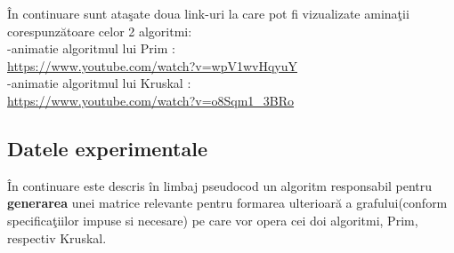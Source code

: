\documentclass[14pt]{article}
\begin{document}
\vspace{10mm}

\^In continuare sunt ata\c sate doua link-uri la care pot fi vizualizate amina\c tii corespunz\u{a}toare celor 2 algoritmi:\\

\vspace{1mm}
-animatie algoritmul lui Prim :\\
\textcolor{blue}{\url{https://www.youtube.com/watch?v=wpV1wvHqyuY}}\\
-animatie algoritmul lui Kruskal :\\
\textcolor{blue}{\url{https://www.youtube.com/watch?v=o8Sqm1_3BRo}}

\newpage

\subsection{Datele experimentale}
\vspace{3mm}
\^In continuare este descris \^in limbaj pseudocod un algoritm responsabil pentru \textbf{generarea} unei matrice relevante pentru formarea ulterioar\u{a} a grafului(conform specifica\c tiilor impuse si necesare) pe care vor opera cei doi algoritmi, Prim, respectiv Kruskal.  
\end{document}
